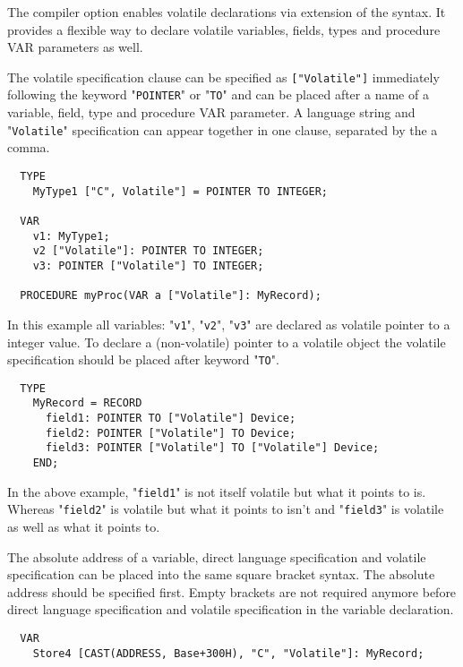 \mextonly

The compiler option  enables volatile 
declarations via extension of the  
syntax. It provides a flexible way to declare volatile variables, 
fields, types and procedure VAR parameters as well.

The volatile specification clause can be specified as \verb|["Volatile"]|
immediately following the keyword "{\tt POINTER}" or "{\tt TO}" and can be
placed after a name of a variable, field, type and procedure VAR parameter.
A language string and "{\tt Volatile}" specification can appear together 
in one clause,  separated by the a comma.   

\Example
\begin{verbatim}
  TYPE
    MyType1 ["C", Volatile"] = POINTER TO INTEGER;

  VAR
    v1: MyType1;
    v2 ["Volatile"]: POINTER TO INTEGER;
    v3: POINTER ["Volatile"] TO INTEGER;
    
  PROCEDURE myProc(VAR a ["Volatile"]: MyRecord);
\end{verbatim}

In this example all variables: "{\tt v1}", "{\tt v2}", "{\tt v3}" 
are declared as volatile pointer to a integer value. To declare a 
(non-volatile) pointer to a volatile object the volatile specification 
should be placed after keyword "{\tt TO}".

\Example
\begin{verbatim}
  TYPE
    MyRecord = RECORD
      field1: POINTER TO ["Volatile"] Device;
      field2: POINTER ["Volatile"] TO Device;
      field3: POINTER ["Volatile"] TO ["Volatile"] Device;
    END;
\end{verbatim}

In the above example, "{\tt field1}" is not itself volatile but what 
it points to is. Whereas "{\tt field2}" is volatile but what it points 
to isn't and "{\tt field3}" is volatile as well as what it points to.

The absolute address of a variable, direct language specification and 
volatile specification can be placed into the same square bracket syntax.
The absolute address should be specified first. Empty brackets are not 
required anymore before direct language specification and volatile 
specification in the variable declaration.

\Example
\begin{verbatim}
  VAR
    Store4 [CAST(ADDRESS, Base+300H), "C", "Volatile"]: MyRecord;
\end{verbatim}

